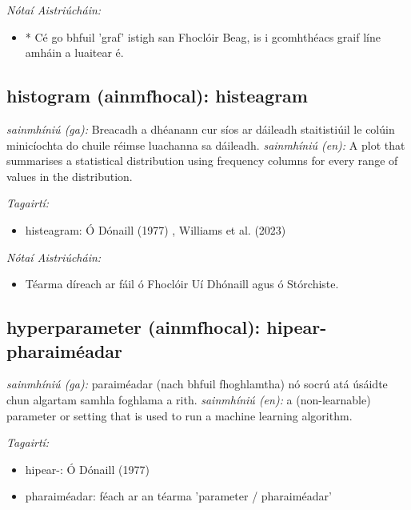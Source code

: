 \documentclass{article}
\begin{document}
 \noindent \textit{Nótaí Aistriúcháin:}
\begin{itemize}
	\item * Cé go bhfuil 'graf' istigh san Fhoclóir Beag, is i gcomhthéacs graif líne amháin a luaitear é.
\end{itemize}


\subsection*{histogram (ainmfhocal): histeagram} 
 \noindent \textit{sainmhíniú (ga):} Breacadh a dhéanann cur síos ar dáileadh staitistiúil le colúin minicíochta do chuile réimse luachanna sa dáileadh.
\newline\newline
 \noindent \textit{sainmhíniú (en):} A plot that summarises a statistical distribution using frequency columns for every range of values in the distribution.
\newline

 \noindent \textit{Tagairtí:}
\begin{itemize}
	\item histeagram: Ó Dónaill (1977) \cite{odonaill}, Williams et al. (2023) \cite{storchiste}
\end{itemize}

 \noindent \textit{Nótaí Aistriúcháin:}
\begin{itemize}
	\item Téarma díreach ar fáil ó Fhoclóir Uí Dhónaill agus ó Stórchiste.
\end{itemize}


\subsection*{hyperparameter (ainmfhocal): hipear-pharaiméadar} 
 \noindent \textit{sainmhíniú (ga):} paraiméadar (nach bhfuil fhoghlamtha) nó socrú atá úsáidte chun algartam samhla foghlama a rith.
\newline\newline
 \noindent \textit{sainmhíniú (en):} a (non-learnable) parameter or setting that is used to run a machine learning algorithm.
\newline

 \noindent \textit{Tagairtí:}
\begin{itemize}
	\item hipear-: Ó Dónaill (1977) \cite{odonaill}
	\item pharaiméadar: féach ar an téarma 'parameter / pharaiméadar'
\end{itemize}
\end{document}
